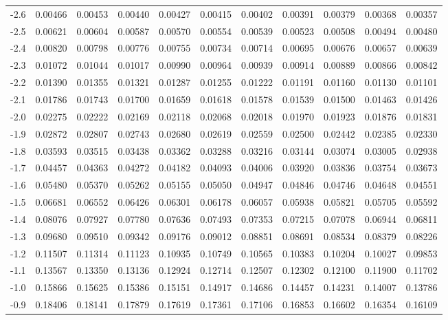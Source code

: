 \documentclass{article}
\begin{document}
\begin{center}
\begin{tabular}{*{11}{M{12.9mm}}}
-2.6 & 0.00466 & 0.00453 & 0.00440 & 0.00427 & 0.00415 & 0.00402 & 0.00391 & 0.00379 & 0.00368 & 0.00357\\
-2.5 & 0.00621 & 0.00604 & 0.00587 & 0.00570 & 0.00554 & 0.00539 & 0.00523 & 0.00508 & 0.00494 & 0.00480\\
-2.4 & 0.00820 & 0.00798 & 0.00776 & 0.00755 & 0.00734 & 0.00714 & 0.00695 & 0.00676 & 0.00657 & 0.00639\\
-2.3 & 0.01072 & 0.01044 & 0.01017 & 0.00990 & 0.00964 & 0.00939 & 0.00914 & 0.00889 & 0.00866 & 0.00842\\
-2.2 & 0.01390 & 0.01355 & 0.01321 & 0.01287 & 0.01255 & 0.01222 & 0.01191 & 0.01160 & 0.01130 & 0.01101\\
-2.1 & 0.01786 & 0.01743 & 0.01700 & 0.01659 & 0.01618 & 0.01578 & 0.01539 & 0.01500 & 0.01463 & 0.01426\\
-2.0 & 0.02275 & 0.02222 & 0.02169 & 0.02118 & 0.02068 & 0.02018 & 0.01970 & 0.01923 & 0.01876 & 0.01831\\
-1.9 & 0.02872 & 0.02807 & 0.02743 & 0.02680 & 0.02619 & 0.02559 & 0.02500 & 0.02442 & 0.02385 & 0.02330\\
-1.8 & 0.03593 & 0.03515 & 0.03438 & 0.03362 & 0.03288 & 0.03216 & 0.03144 & 0.03074 & 0.03005 & 0.02938\\
-1.7 & 0.04457 & 0.04363 & 0.04272 & 0.04182 & 0.04093 & 0.04006 & 0.03920 & 0.03836 & 0.03754 & 0.03673\\
-1.6 & 0.05480 & 0.05370 & 0.05262 & 0.05155 & 0.05050 & 0.04947 & 0.04846 & 0.04746 & 0.04648 & 0.04551\\
-1.5 & 0.06681 & 0.06552 & 0.06426 & 0.06301 & 0.06178 & 0.06057 & 0.05938 & 0.05821 & 0.05705 & 0.05592\\
-1.4 & 0.08076 & 0.07927 & 0.07780 & 0.07636 & 0.07493 & 0.07353 & 0.07215 & 0.07078 & 0.06944 & 0.06811\\
-1.3 & 0.09680 & 0.09510 & 0.09342 & 0.09176 & 0.09012 & 0.08851 & 0.08691 & 0.08534 & 0.08379 & 0.08226\\
-1.2 & 0.11507 & 0.11314 & 0.11123 & 0.10935 & 0.10749 & 0.10565 & 0.10383 & 0.10204 & 0.10027 & 0.09853\\
-1.1 & 0.13567 & 0.13350 & 0.13136 & 0.12924 & 0.12714 & 0.12507 & 0.12302 & 0.12100 & 0.11900 & 0.11702\\
-1.0 & 0.15866 & 0.15625 & 0.15386 & 0.15151 & 0.14917 & 0.14686 & 0.14457 & 0.14231 & 0.14007 & 0.13786\\
-0.9 & 0.18406 & 0.18141 & 0.17879 & 0.17619 & 0.17361 & 0.17106 & 0.16853 & 0.16602 & 0.16354 & 0.16109\\

\end{tabular}
\end{center}
\end{document}
